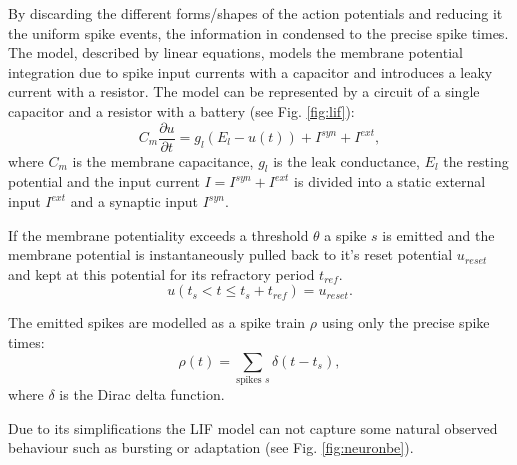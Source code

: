 By discarding the different forms/shapes of the action potentials and reducing it the uniform spike events, the information in condensed to the precise spike times.
The model, described by linear equations, models the membrane potential integration due to spike input currents with a capacitor and introduces a leaky current with a resistor. 
The model can be represented by a circuit of a single capacitor and a resistor with a battery (see Fig. \ref{fig:lif}):
\[
C_m \frac{\partial u}{\partial t} = g_l ( E_l - u(t) ) + I^{syn} + I^{ext} , 
\]
where $C_m$ is the membrane capacitance, $g_l$ is the leak conductance, $E_l$ the resting potential and the input current $I = I^{syn} + I^{ext}$ is divided into a static external input $I^{ext}$ and a synaptic input $I^{syn}$.   

If the membrane potentiality exceeds a threshold $\theta$ a spike $s$ is emitted and the membrane potential is instantaneously pulled back to it's reset potential $u_{reset}$ and kept at this potential for its refractory period $t_{ref}$.
\[
u(t_{s} < t \le t_{s} + t_{ref}) = u_{reset}.
\]

The emitted spikes are modelled as a spike train $\rho$ using only the precise spike times:
\[
\rho(t) = \sum_{\text{spikes } s} \delta(t-t_s),
\] 
where $\delta$ is the Dirac delta function.

Due to its simplifications the LIF model can not capture some natural observed behaviour such as bursting or adaptation (see Fig. \ref{fig:neuronbe}). 


